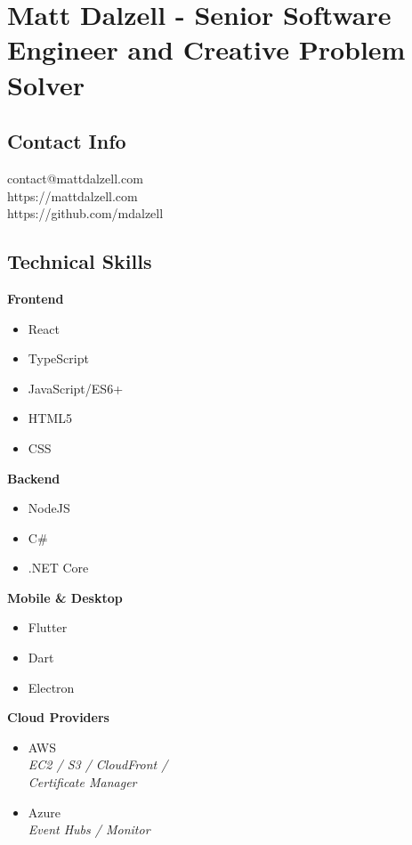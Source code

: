 \documentclass[10pt]{article}
\begin{document}

\section*{Matt Dalzell - {\large Senior Software Engineer and Creative Problem Solver}}

\setlength{\columnsep}{4em}
\setlength{\columnseprule}{0.1pt}
\begin{paracol}{2}

    \subsection*{Contact Info}
    contact@mattdalzell.com \\
    https://mattdalzell.com \\
    https://github.com/mdalzell

    \subsection*{Technical Skills}

    \textbf{Frontend}
    \begin{itemize}
        \item React
        \item TypeScript
        \item JavaScript/ES6+
        \item HTML5
        \item CSS
    \end{itemize}

    \noindent \textbf{Backend}
    \begin{itemize}
        \item NodeJS
        \item C\#
        \item .NET Core
    \end{itemize}

    \noindent \textbf{Mobile \& Desktop}
    \begin{itemize}
        \item Flutter
        \item Dart
        \item Electron
    \end{itemize}

    \noindent \textbf{Cloud Providers}
    \begin{itemize}
        \item AWS  \\ {\footnotesize{\textit{EC2 / S3 / CloudFront / \\ Certificate Manager}}}
        \item Azure \\ {\footnotesize{\textit{Event Hubs / Monitor}}}
    \end{itemize}


\end{paracol}
\end{document}
